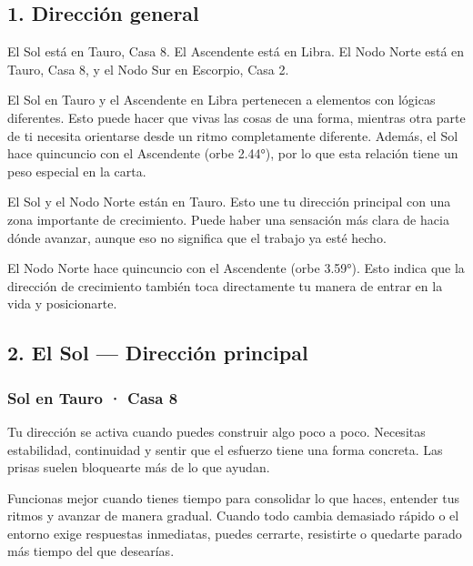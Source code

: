 \documentclass[11pt,a4paper]{article}
\begin{document}
\subsection{1. Dirección general}

El Sol está en Tauro, Casa 8. El Ascendente está en Libra. El Nodo Norte está en Tauro, Casa 8, y el Nodo Sur en Escorpio, Casa 2.

El Sol en Tauro y el Ascendente en Libra pertenecen a elementos con lógicas diferentes. Esto puede hacer que vivas las cosas de una forma, mientras otra parte de ti necesita orientarse desde un ritmo completamente diferente. Además, el Sol hace quincuncio con el Ascendente (orbe 2.44°), por lo que esta relación tiene un peso especial en la carta.

El Sol y el Nodo Norte están en Tauro. Esto une tu dirección principal con una zona importante de crecimiento. Puede haber una sensación más clara de hacia dónde avanzar, aunque eso no significa que el trabajo ya esté hecho.

El Nodo Norte hace quincuncio con el Ascendente (orbe 3.59°). Esto indica que la dirección de crecimiento también toca directamente tu manera de entrar en la vida y posicionarte.

\vspace{0.5cm}


\subsection{2. El Sol — Dirección principal}

\subsubsection*{Sol en Tauro · Casa 8}

Tu dirección se activa cuando puedes construir algo poco a poco. Necesitas estabilidad, continuidad y sentir que el esfuerzo tiene una forma concreta. Las prisas suelen bloquearte más de lo que ayudan.

Funcionas mejor cuando tienes tiempo para consolidar lo que haces, entender tus ritmos y avanzar de manera gradual. Cuando todo cambia demasiado rápido o el entorno exige respuestas inmediatas, puedes cerrarte, resistirte o quedarte parado más tiempo del que desearías.
\end{document}
